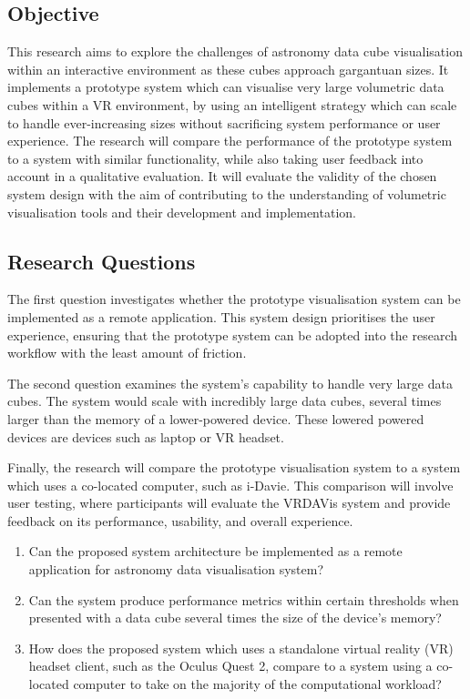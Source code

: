 \subsection{Objective}
This research aims to explore the challenges of astronomy data cube visualisation within an interactive environment as these cubes approach gargantuan sizes.
It implements a prototype system which can visualise very large volumetric data cubes within a VR environment, by using an intelligent strategy which can scale to handle ever-increasing sizes without sacrificing system performance or user experience.
The research will compare the performance of the prototype system to a system with similar functionality, while also taking user feedback into account in a qualitative evaluation. 
It will evaluate the validity of the chosen system design with the aim of contributing to the understanding of volumetric visualisation tools and their development and implementation.


\subsection{Research Questions}
The first question investigates whether the prototype visualisation system can be implemented as a remote application.
This system design prioritises the user experience, ensuring that the prototype system can be adopted into the research workflow with the least amount of friction.

The second question examines the system's capability to handle very large data cubes. 
The system would scale with incredibly large data cubes, several times larger than the memory of a lower-powered device.
These lowered powered devices are devices such as laptop or VR headset.

Finally, the research will compare the prototype visualisation system to a system which uses a co-located computer, such as i-Davie.
This comparison will involve user testing, where participants will evaluate the VRDAVis system and provide feedback on its performance, usability, and overall experience.
\begin{enumerate}
    \item Can the proposed system architecture be implemented as a remote application for astronomy data visualisation system? 
    \item Can the system produce performance metrics within certain thresholds when presented with a data cube several times the size of the device's memory?
    \item How does the proposed system which uses a standalone virtual reality (VR) headset client, such as the Oculus Quest 2, compare to a system using a co-located computer to take on the majority of the computational workload?
\end{enumerate}

